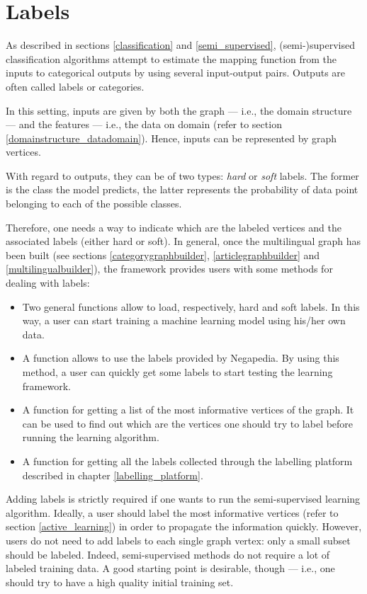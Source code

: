     \section{Labels}\label{labels}
        As described in sections \ref{classification} and \ref{semi_supervised}, (semi-)supervised classification algorithms attempt to estimate the mapping function from the inputs to categorical outputs by using several input-output pairs. Outputs are often called labels or categories.
        
        In this setting, inputs are given by both the graph --- i.e., the domain structure --- and the features --- i.e., the data on domain (refer to section \ref{domainstructure_datadomain}). Hence, inputs can be represented by graph vertices.
        
        With regard to outputs, they can be of two types: \emph{hard} or \emph{soft} labels. The former is the class the model predicts, the latter represents the probability of data point belonging to each of the possible classes.
        
        Therefore, one needs a way to indicate which are the labeled vertices and the associated labels (either hard or soft). In general, once the multilingual graph has been built (see sections \ref{categorygraphbuilder}, \ref{articlegraphbuilder} and \ref{multilingualbuilder}), the framework provides users with some methods for dealing with labels:
        \begin{itemize}
            \item Two general functions allow to load, respectively, hard and soft labels. In this way, a user can start training a machine learning model using his/her own data.
            \item A function allows to use the labels provided by Negapedia. By using this method, a user can quickly get some labels to start testing the learning framework.
            \item A function for getting a list of the most informative vertices of the graph. It can be used to find out which are the vertices one should try to label before running the learning algorithm.
            \item A function for getting all the labels collected through the labelling platform described in chapter \ref{labelling_platform}.
        \end{itemize}
        
        Adding labels is strictly required if one wants to run the semi-supervised learning algorithm. Ideally, a user should label the most informative vertices (refer to section \ref{active_learning}) in order to propagate the information quickly. However, users do not need to add labels to each single graph vertex: only a small subset should be labeled. Indeed, semi-supervised methods do not require a lot of labeled training data. A good starting point is desirable, though --- i.e., one should try to have a high quality initial training set.
